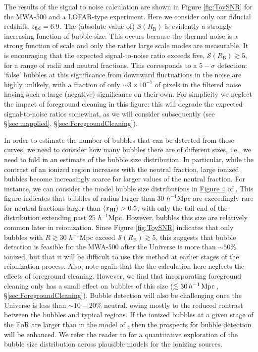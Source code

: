 The results of the signal to noise calculation are shown in Figure
\ref{fig:ToySNR} for the MWA-500 and a LOFAR-type experiment. 
Here we consider only our
fiducial redshift, $z_{\rm fid} = 6.9$. The (absolute value of)
$\mathcal{S}(R_{\text{B}})$ is evidently a strongly increasing
function of bubble size. This occurs because the thermal noise is a
strong function of scale and only the rather large scale modes are
measurable. It is encouraging that the expected signal-to-noise ratio
exceeds five, $\mathcal{S}(R_{\text{B}}) \gtrsim 5$, for a range of
radii and neutral fractions. This corresponds to a $5-\sigma$
detection: `false' bubbles at this significance from downward
fluctuations in the noise are highly unlikely, with a fraction of 
only $\sim 3 \times 10^{-7}$ of pixels in the filtered noise having such a large
(negative) significance on their own. For simplicity we neglect
the impact of foreground cleaning in this figure: this will 
degrade the expected signal-to-noise ratios somewhat, as we will
consider subsequently (see \S \ref{sec:mapplied}, \S \ref{sec:ForegroundCleaning}).

In order to estimate the number of bubbles that can be detected from these curves, we need to consider
how many bubbles there are of different sizes, i.e., we need to fold in an estimate of the bubble
size distribution. In particular, while the contrast of an ionized region increases with the
neutral fraction, large ionized bubbles become increasingly scarce for larger values of the neutral
fraction. For instance, we can consider the model bubble size distributions in
\href{http://iopscience.iop.org/0004-637X/654/1/12/fulltext/65071.fg4.html}{Figure
  4} of \cite{Zahn:2006sg}. This figure indicates that bubbles of radius larger than $30$ $h^{-1}$Mpc
are exceedingly rare for neutral fractions larger than $\langle x_{\rm HI}\rangle > 0.5$, with only
the tail end of the distribution extending past $25$ $h^{-1}$Mpc. However, bubbles this size
are relatively common later in reionization. Since Figure \ref{fig:ToySNR} indicates
that only bubbles with $R \gtrsim 30$ $h^{-1}$Mpc exceed $\mathcal{S}(R_{\text{B}}) \gtrsim 5$,
this suggests that bubble detection is feasible for the MWA-500 after the Universe is more than
$\sim 50\%$ ionized, but that it will be difficult to use this method at earlier
stages of the reionization process. Also, note again that the the calculation here neglects the effects of foreground cleaning. However, we find that incorporating foreground cleaning only has a small effect on bubbles of this size ($\lesssim 30\,h^{-1}\,{\rm Mpc}\,$, \S \ref{sec:ForegroundCleaning}). Bubble detection will also be challenging once
the Universe is less than $\sim 10-20\%$ neutral, owing mostly to the reduced contrast
between the bubbles and typical regions. If the ionized bubbles at a given stage of the EoR are larger than in
the model of \cite{Zahn:2006sg}, then the prospects for bubble detection will be enhanced. We refer
the reader to \cite{McQuinn:2006et} for a quantitative exploration of the bubble size distribution across
plausible models for the ionizing sources.



